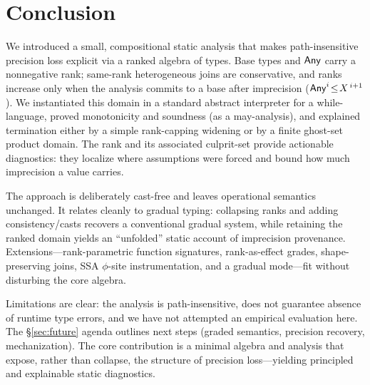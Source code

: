 \section{Conclusion}
\label{sec:conclusion}

We introduced a small, compositional static analysis that makes path-insensitive precision loss explicit via a ranked algebra of types. Base types and $\mathsf{Any}$ carry a nonnegative rank; same-rank heterogeneous joins are conservative, and ranks increase only when the analysis commits to a base after imprecision ($\mathsf{Any}^{i}\!\le\!X^{\,i+1}$). We instantiated this domain in a standard abstract interpreter for a \textsf{while}-language, proved monotonicity and soundness (as a may-analysis), and explained termination either by a simple rank-capping widening or by a finite ghost-set product domain. The rank and its associated culprit-set provide actionable diagnostics: they localize where assumptions were forced and bound how much imprecision a value carries.

The approach is deliberately cast-free and leaves operational semantics unchanged. It relates cleanly to gradual typing: collapsing ranks and adding consistency/casts recovers a conventional gradual system, while retaining the ranked domain yields an ``unfolded'' static account of imprecision provenance. Extensions—rank-parametric function signatures, rank-as-effect grades, shape-preserving joins, SSA $\phi$-site instrumentation, and a gradual mode—fit without disturbing the core algebra.

Limitations are clear: the analysis is path-insensitive, does not guarantee absence of runtime type errors, and we have not attempted an empirical evaluation here. The \S\ref{sec:future} agenda outlines next steps (graded semantics, precision recovery, mechanization). The core contribution is a minimal algebra and analysis that expose, rather than collapse, the structure of precision loss—yielding principled and explainable static diagnostics.
